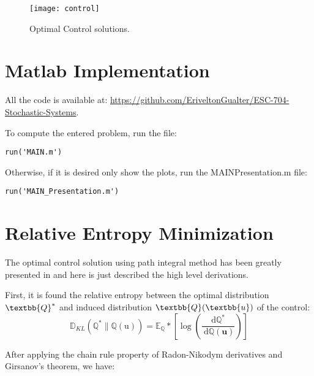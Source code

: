 \documentclass[]{hdsr}
\begin{document}
\begin{figure}[H]
\centering
\texttt{[image: control]}
\caption{Optimal Control solutions.}
\label{fig:acrobot3}
\end{figure}

\section{Matlab Implementation}

All the code is available at: \url{https://github.com/EriveltonGualter/ESC-704-Stochastic-Systems}.

To compute the entered problem, run the  file:

\begin{lstlisting}
run('MAIN.m')
\end{lstlisting}

Otherwise, if it is desired only show the plots, run the MAINPresentation.m file:

\begin{lstlisting}
run('MAIN_Presentation.m')
\end{lstlisting}



\restoregeometry
{}

\appendix

\section{Relative Entropy Minimization}
\label{appendix-customize-this-label}

The optimal control solution using path integral method has been greatly presented in \citet{williams2016aggressive} and here is just described the high level derivations.

First, it is found the relative entropy between the optimal distribution $\textbb{Q}^*$ and induced distribution $\textbb{Q}(\textbb{u})$ of the control:
\begin{equation}
\mathbb{D}_{K L}\left(\mathbb{Q}^{*} \| \mathbb{Q}(\mathrm{u})\right)=\mathbb{E}_{\mathbb{Q}} *\left[\log \left(\frac{\mathrm{d} \mathbb{Q}^{*}}{\mathrm{~d} \mathbb{Q}(\mathbf{u})}\right)\right]
\end{equation}

After applying the chain rule property of Radon-Nikodym derivatives and Girsanov's theorem, we have:
\end{document}
